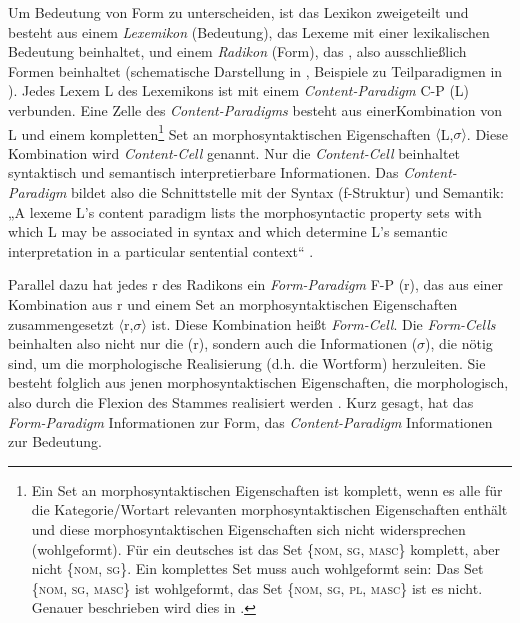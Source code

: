 Um Bedeutung von Form zu unterscheiden, ist das Lexikon zweigeteilt und besteht aus einem \textit{Lexemikon} (Bedeutung), das Lexeme mit einer lexikalischen Bedeutung beinhaltet, und einem \textit{Radikon} (Form), das , also ausschließlich Formen beinhaltet (schematische Darstellung in , Beispiele zu Teilparadigmen in ). Jedes Lexem L des Lexemikons ist mit einem \textit{Content-Paradigm} C-P (L) verbunden. Eine Zelle des \textit{Content-Paradigms} besteht aus einer\pagebreak[4]\largerpage[2] Kombination von L und einem kompletten\footnote{Ein Set an morphosyntaktischen Eigenschaften ist komplett, wenn es alle für die Kategorie/Wortart relevanten morphosyntaktischen Eigenschaften enthält und diese morphosyntaktischen Eigenschaften sich nicht widersprechen (wohlgeformt). Für ein deutsches  ist das Set \{\textsc{nom}, \textsc{sg}, \textsc{masc}\} komplett, aber nicht \{\textsc{nom}, \textsc{sg}\}. Ein komplettes Set muss auch wohlgeformt sein: Das Set \{\textsc{nom}, \textsc{sg}, \textsc{masc}\} ist wohlgeformt, das Set \{\textsc{nom}, \textsc{sg}, \textsc{pl}, \textsc{masc}\} ist es nicht. Genauer beschrieben wird dies in .} Set an morphosyntaktischen Eigenschaften $\langle$L,$\sigma$$\rangle$. Diese Kombination wird \textit{Content-Cell} genannt. Nur die \textit{Content-Cell} beinhaltet syntaktisch und semantisch interpretierbare Informationen. Das \textit{Content-Paradigm} bildet also die Schnittstelle mit der Syntax (f-Struk\-tur) und Semantik: „A lexeme L’s content paradigm lists the morphosyntactic property sets with which L may be associated in syntax and which determine L’s semantic interpretation in a particular sentential context“ \citep[104]{Stump2016}.

Parallel dazu hat jedes r des Radikons ein \textit{Form-Paradigm} F-P (r), das aus einer Kombination aus r und einem Set an morphosyntaktischen Eigenschaften zusammengesetzt $\langle$r,$\sigma$$\rangle$ ist. Diese Kombination heißt \textit{Form-Cell}. Die \textit{Form-Cells} beinhalten also nicht nur die  (r), sondern auch die Informationen ($\sigma $), die nötig sind, um die morphologische Realisierung (d.h. die Wortform) herzuleiten. Sie besteht folglich aus jenen morphosyntaktischen Eigenschaften, die morphologisch, also durch die Flexion des Stammes realisiert werden \citep[104]{Stump2016}. Kurz gesagt, hat das \textit{Form-Paradigm} Informationen zur Form, das \textit{Content-Paradigm} Informationen zur Bedeutung.


